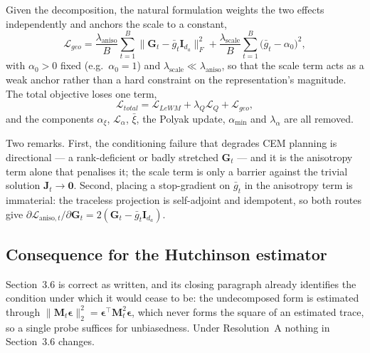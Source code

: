 ﻿\documentclass{article}
\begin{document}
Given the decomposition, the natural formulation weights the two effects
independently and anchors the scale to a constant,
\begin{equation}
  \mathcal{L}_{geo}
  =\frac{\lambda_{\text{aniso}}}{B}\sum_{t=1}^{B}
     \bigl\|\mathbf{G}_t-\bar g_t\mathbf{I}_{d_a}\bigr\|_F^2
  +\frac{\lambda_{\text{scale}}}{B}\sum_{t=1}^{B}
     \bigl(\bar g_t-\alpha_0\bigr)^2,
  \label{eq:addendum-split}
\end{equation}
with $\alpha_0>0$ fixed (e.g.\ $\alpha_0=1$) and
$\lambda_{\text{scale}}\ll\lambda_{\text{aniso}}$, so that the scale term acts
as a weak anchor rather than a hard constraint on the representation's
magnitude. The total objective loses one term,
\[
  \mathcal{L}_{total}=\mathcal{L}_{LeWM}+\lambda_Q\mathcal{L}_Q+\mathcal{L}_{geo},
\]
and the components $\alpha_\xi$, $\mathcal{L}_\alpha$, $\bar\xi$, the Polyak
update, $\alpha_{\min}$ and $\lambda_\alpha$ are all removed.

Two remarks. First, the conditioning failure that degrades CEM planning is
directional --- a rank-deficient or badly stretched $\mathbf{G}_t$ --- and it
is the anisotropy term alone that penalises it; the scale term is only a
barrier against the trivial solution $\mathbf{J}_t\to\mathbf{0}$. Second,
placing a stop-gradient on $\bar g_t$ in the anisotropy term is immaterial:
the traceless projection is self-adjoint and idempotent, so both routes give
$\partial\mathcal{L}_{\text{aniso},t}/\partial\mathbf{G}_t
=2(\mathbf{G}_t-\bar g_t\mathbf{I}_{d_a})$.

\subsection{Consequence for the Hutchinson estimator}
\label{sec:addendum-hutch}

Section~3.6 is correct as written, and its closing paragraph already
identifies the condition under which it would cease to be: the undecomposed
form is estimated through $\|\mathbf{M}_t\boldsymbol\epsilon\|_2^2
=\boldsymbol\epsilon^\top\mathbf{M}_t^2\boldsymbol\epsilon$, which never forms
the square of an estimated trace, so a single probe suffices for
unbiasedness. Under Resolution~A nothing in Section~3.6 changes.
\end{document}
